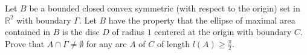 Let $B$ be a bounded closed convex symmetric (with respect to the origin) set in $\mathbb{R}^{2}$ with boundary $\Gamma$. Let $B$ have the property that the ellipse of maximal area contained in $B$ is the disc $D$ of radius $1$ centered at the origin with boundary $C$. Prove that $A \cap \Gamma \ne \emptyset$ for any arc $A$ of $C$ of length $l(A)\geq \frac{\pi}{2}$.